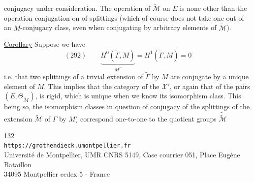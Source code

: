 
conjugacy under consideration. The  operation of $\widetilde{\mathcal M}$ on $E$  is none other than the operation   conjugation on  of splittings (which of course does not take one out of an $M$-conjugacy class, even when conjugating by arbitrary elements of $\widetilde{\mathcal M}$).

\uline{Corollary} Suppose we have
\[
(292)\qquad \underbrace{H^0(\widetilde\Gamma,M)}_{M^\Gamma}=H^1(\widetilde\Gamma,M)=0
\]
i.e. that  two splittings of a trivial extension of $\widetilde\Gamma$ by $M$ are conjugate by a unique element of $M$. This implies  that the category of the $\mathcal X'$, or again that of the pairs $(E,\Theta_{\widetilde{\mathcal M}})$, is rigid,   which is unique when we know its isomorphism class. This being so, the isomorphism classes in question  of  conjugacy of the splittings of  the extension $\widetilde{\mathcal M}$ of $\Gamma$ by $M$) correspond one-to-one to the quotient groups $\widetilde{\widetilde{\mathcal M}}$


\begin{center}
\small
132\\
\texttt{https://grothendieck.umontpellier.fr}\\
Université de Montpellier, UMR CNRS 5149, Case courrier 051, Place Eugène Bataillon\\
34095 Montpellier cedex 5 - France
\end{center}